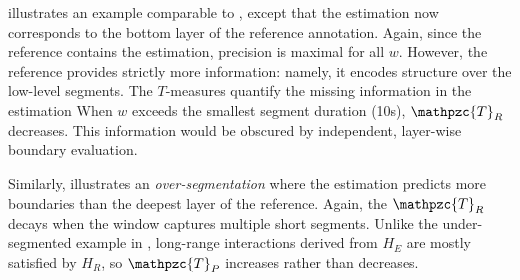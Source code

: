 \documentclass{article}
\def\shag{\ensuremath{\mathpzc{T}}}
\begin{document}
 illustrates an example comparable to , except that the
estimation now corresponds to the bottom layer of the reference annotation.
Again, since the reference contains the estimation, precision is maximal for all $w$.
However, the reference provides strictly more information: namely, it encodes structure over 
the low-level segments.
The $T$-measures quantify the missing information in the estimation
When $w$ exceeds the smallest segment duration (10s), $\shag_R$ decreases.
This information would be obscured by independent, layer-wise boundary evaluation.

Similarly,  illustrates an \emph{over-segmentation} where the estimation
predicts more boundaries than the deepest layer of the reference.  
Again, the $\shag_R$ decays when the window captures multiple short segments.
Unlike the under-segmented example in , long-range interactions derived from $H_E$ are mostly satisfied by $H_R$, so $\shag_P$ increases rather than decreases.
\end{document}
